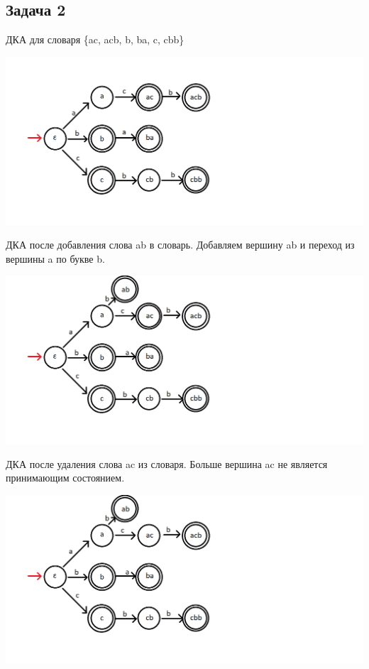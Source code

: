 \documentclass[a4paper,14pt]{article} %
\begin{document}
\subsection{Задача 2}
ДКА для словаря \{ac, acb, b, ba, c, cbb\}

\includegraphics[scale=0.73]{03.png}

ДКА после добавления слова ab в словарь. Добавляем вершину ab и переход из вершины a по букве b.

\includegraphics[scale=0.73]{04.png}

ДКА после удаления слова ac из словаря. Больше вершина ac не является принимающим состоянием.

\includegraphics[scale=0.74]{05.png}
\end{document}
